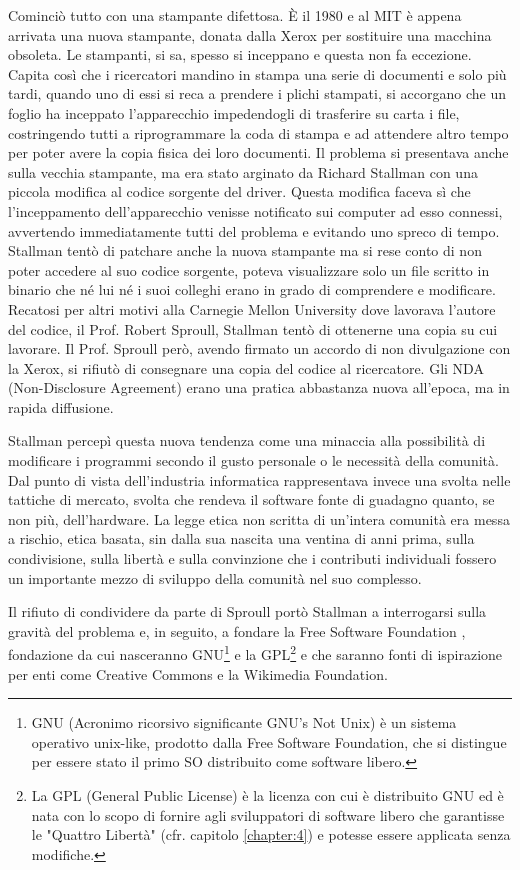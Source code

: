 Cominciò tutto con una stampante difettosa. È il 1980 e al MIT è appena arrivata una nuova
stampante, donata dalla Xerox per sostituire una macchina obsoleta. Le stampanti, si sa,
spesso si inceppano e questa non fa eccezione. Capita così che i ricercatori mandino in
stampa una serie di documenti e solo più tardi, quando uno di essi si reca a prendere i plichi
stampati, si accorgano che un foglio ha inceppato l’apparecchio impedendogli di trasferire
su carta i file, costringendo tutti a riprogrammare la coda di stampa e ad attendere altro
tempo per poter avere la copia fisica dei loro documenti. Il problema si presentava anche
sulla vecchia stampante, ma era stato arginato da Richard Stallman con una piccola modifica
al codice sorgente del driver. Questa modifica faceva sì che l’inceppamento
dell’apparecchio venisse notificato sui computer ad esso connessi, avvertendo
immediatamente tutti del problema e evitando uno spreco di tempo. Stallman tentò di
patchare anche la nuova stampante ma si rese conto di non poter accedere al suo codice
sorgente, poteva visualizzare solo un file scritto in binario che né lui né i suoi colleghi erano
in grado di comprendere e modificare. Recatosi per altri motivi alla Carnegie Mellon
University dove lavorava l’autore del codice, il Prof. Robert Sproull, Stallman tentò di
ottenerne una copia su cui lavorare. Il Prof. Sproull però, avendo firmato un accordo di non
divulgazione con la Xerox, si rifiutò di consegnare una copia del codice al ricercatore. Gli
NDA (Non-Disclosure Agreement) erano una pratica abbastanza nuova all’epoca, ma in
rapida diffusione.

Stallman percepì questa nuova tendenza come una minaccia alla possibilità di
modificare i programmi secondo il gusto personale o le necessità della comunità. Dal punto
di vista dell’industria informatica rappresentava invece una svolta nelle tattiche di mercato,
svolta che rendeva il software fonte di guadagno quanto, se non più, dell’hardware. La legge
etica non scritta di un’intera comunità era messa a rischio, etica basata, sin dalla sua nascita
una ventina di anni prima, sulla condivisione, sulla libertà e sulla convinzione che i contributi
individuali fossero un importante mezzo di sviluppo della comunità nel suo complesso.

Il rifiuto di condividere da parte di Sproull portò Stallman a interrogarsi sulla gravità
del problema e, in seguito, a fondare la Free Software Foundation \parencite{williams,stegman},
fondazione da cui nasceranno GNU\footnote{GNU (Acronimo ricorsivo significante GNU's Not Unix) è un sistema operativo unix-like, prodotto dalla Free Software Foundation, che si
distingue per essere stato il primo SO distribuito come software libero.} e la GPL\footnote{La GPL (General Public License) è la licenza con cui è distribuito GNU ed è nata con lo scopo di fornire agli sviluppatori di software
libero che garantisse le "Quattro Libertà" (cfr. capitolo \ref{chapter:4}) e potesse essere applicata senza modifiche.} e che saranno fonti di
ispirazione per enti come Creative Commons e la Wikimedia Foundation.